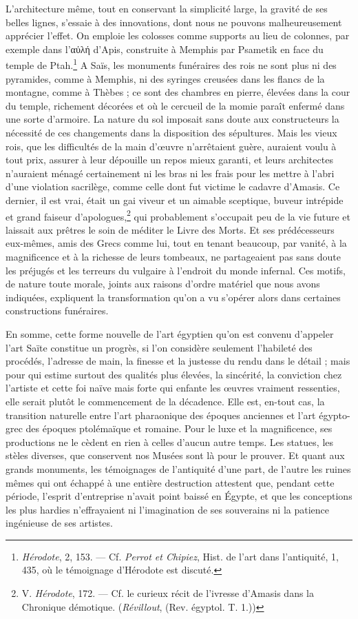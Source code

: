 \documentclass[a4paper, 11pt, oneside]{article}
\begin{document}
L'architecture même, tout en conservant la simplicité large, la gravité de ses belles lignes, s'essaie à des innovations, dont nous ne pouvons malheureusement apprécier l'effet. On emploie les colosses comme supports au lieu de colonnes, par exemple dans l'αὐλή d'Apis, construite à Memphis par Psametik en face du temple de Ptah.\footnote{\emph{Hérodote}, 2, 153. --- Cf. \emph{Perrot et Chipiez}, Hist. de l'art dans l'antiquité, 1, 435, où le témoignage d'Hérodote est discuté.} A Saïs, les monuments funéraires des rois ne sont plus ni des pyramides, comme à Memphis, ni des syringes creusées dans les flancs de la montagne, comme à Thèbes ; ce sont des chambres en pierre, élevées dans la cour du temple, richement décorées et où le cercueil de la momie paraît enfermé dans une sorte d'armoire. La nature du sol imposait sans doute aux constructeurs la nécessité de ces changements dans la disposition des sépultures. Mais les vieux rois, que les difficultés de la main d'œuvre n'arrêtaient guère, auraient voulu à tout prix, assurer à leur dépouille un repos mieux garanti, et leurs architectes n'auraient ménagé certainement ni les bras ni les frais pour les mettre à l'abri d'une violation sacrilège, comme celle dont fut victime le cadavre d'Amasis. Ce dernier, il est vrai, était un gai viveur et un aimable sceptique, buveur intrépide et grand faiseur d'apologues,\footnote{V. \emph{Hérodote}, 172. --- Cf. le curieux récit de l'ivresse d'Amasis dans la Chronique démotique. (\emph{Révillout}, (Rev. égyptol. T. 1.))} qui probablement s'occupait peu de la vie future et laissait aux prêtres le soin de méditer le Livre des Morts. Et ses prédécesseurs eux-mêmes, amis des Grecs comme lui, tout en tenant beaucoup, par vanité, à la magnificence et à la richesse de leurs tombeaux, ne partageaient pas sans doute les préjugés et les terreurs du vulgaire à l'endroit du monde infernal. Ces motifs, de nature toute morale, joints aux raisons d'ordre matériel que nous avons indiquées, expliquent la transformation qu'on a vu s'opérer alors dans certaines constructions funéraires.

En somme, cette forme nouvelle de l'art égyptien qu'on est convenu d'appeler l'art Saïte constitue un progrès, si l'on considère seulement l'habileté des procédés, l'adresse de main, la finesse et la justesse du rendu dans le détail ; mais pour qui estime surtout des qualités plus élevées, la sincérité, la conviction chez l'artiste et cette foi naïve mais forte qui enfante les œuvres vraiment ressenties, elle serait plutôt le commencement de la décadence. Elle est, en-tout cas, la transition naturelle entre l'art pharaonique des époques anciennes et l'art égypto-grec des époques ptolémaïque et romaine. Pour le luxe et la magnificence, ses productions ne le cèdent en rien à celles d'aucun autre temps. Les statues, les stèles diverses, que conservent nos Musées sont là pour le prouver. Et quant aux grands monuments, les témoignages de l'antiquité d'une part, de l'autre les ruines mêmes qui ont échappé à une entière destruction attestent que, pendant cette période, l'esprit d'entreprise n'avait point baissé en Égypte, et que les conceptions les plus hardies n'effrayaient ni l'imagination de ses souverains ni la patience ingénieuse de ses artistes.
\end{document}
